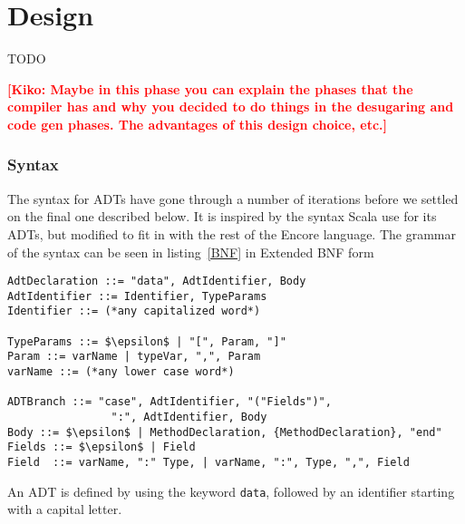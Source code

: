 \documentclass[10pt]{report}
\newcommand{\KIKO}[1]{\textcolor{red}{\textbf{[Kiko: #1]}}}
\def\code#1{\texttt{#1}} %
\begin{document}
{\chapter{Design}
TODO

\KIKO{Maybe in this phase you can explain the phases that the compiler has and
  why you decided to do things in the desugaring and code gen phases. The advantages
of this design choice, etc.}

\subsection{Syntax}
\par{The syntax for ADTs have gone through a number of iterations before we settled on the final one described below.  It is inspired by the syntax Scala use for its ADTs, but modified to fit in with the rest of the Encore language. The grammar of the syntax can be seen in listing~\ref{BNF} in Extended BNF form\cite{eBNF}}%

\begin{lstlisting}[language=Encore,caption={Grammar for the suggested syntax},label=BNF,mathescape=true]
AdtDeclaration ::= "data", AdtIdentifier, Body
AdtIdentifier ::= Identifier, TypeParams
Identifier ::= (*any capitalized word*)

TypeParams ::= $\epsilon$ | "[", Param, "]"
Param ::= varName | typeVar, ",", Param
varName ::= (*any lower case word*)

ADTBranch ::= "case", AdtIdentifier, "("Fields")",
                ":", AdtIdentifier, Body
Body ::= $\epsilon$ | MethodDeclaration, {MethodDeclaration}, "end"
Fields ::= $\epsilon$ | Field
Field  ::= varName, ":" Type, | varName, ":", Type, ",", Field
\end{lstlisting}

\par{An ADT is defined by using the keyword \code{data}, followed by an identifier starting with a capital letter.}

}
\end{document}
